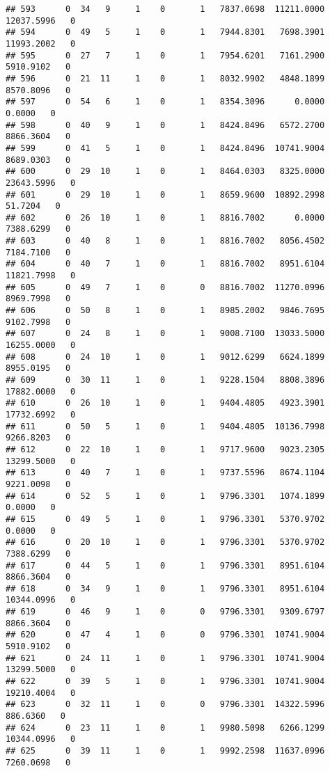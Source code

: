 \documentclass[
]{article}
\begin{document}
\begin{enumerate}
\begin{verbatim}
## 593      0  34   9     1    0       1   7837.0698  11211.0000  12037.5996   0
## 594      0  49   5     1    0       1   7944.8301   7698.3901  11993.2002   0
## 595      0  27   7     1    0       1   7954.6201   7161.2900   5910.9102   0
## 596      0  21  11     1    0       1   8032.9902   4848.1899   8570.8096   0
## 597      0  54   6     1    0       1   8354.3096      0.0000      0.0000   0
## 598      0  40   9     1    0       1   8424.8496   6572.2700   8866.3604   0
## 599      0  41   5     1    0       1   8424.8496  10741.9004   8689.0303   0
## 600      0  29  10     1    0       1   8464.0303   8325.0000  23643.5996   0
## 601      0  29  10     1    0       1   8659.9600  10892.2998     51.7204   0
## 602      0  26  10     1    0       1   8816.7002      0.0000   7388.6299   0
## 603      0  40   8     1    0       1   8816.7002   8056.4502   7184.7100   0
## 604      0  40   7     1    0       1   8816.7002   8951.6104  11821.7998   0
## 605      0  49   7     1    0       0   8816.7002  11270.0996   8969.7998   0
## 606      0  50   8     1    0       1   8985.2002   9846.7695   9102.7998   0
## 607      0  24   8     1    0       1   9008.7100  13033.5000  16255.0000   0
## 608      0  24  10     1    0       1   9012.6299   6624.1899   8955.0195   0
## 609      0  30  11     1    0       1   9228.1504   8808.3896  17882.0000   0
## 610      0  26  10     1    0       1   9404.4805   4923.3901  17732.6992   0
## 611      0  50   5     1    0       1   9404.4805  10136.7998   9266.8203   0
## 612      0  22  10     1    0       1   9717.9600   9023.2305  13299.5000   0
## 613      0  40   7     1    0       1   9737.5596   8674.1104   9221.0098   0
## 614      0  52   5     1    0       1   9796.3301   1074.1899      0.0000   0
## 615      0  49   5     1    0       1   9796.3301   5370.9702      0.0000   0
## 616      0  20  10     1    0       1   9796.3301   5370.9702   7388.6299   0
## 617      0  44   5     1    0       1   9796.3301   8951.6104   8866.3604   0
## 618      0  34   9     1    0       1   9796.3301   8951.6104  10344.0996   0
## 619      0  46   9     1    0       0   9796.3301   9309.6797   8866.3604   0
## 620      0  47   4     1    0       0   9796.3301  10741.9004   5910.9102   0
## 621      0  24  11     1    0       1   9796.3301  10741.9004  13299.5000   0
## 622      0  39   5     1    0       1   9796.3301  10741.9004  19210.4004   0
## 623      0  32  11     1    0       0   9796.3301  14322.5996    886.6360   0
## 624      0  23  11     1    0       1   9980.5098   6266.1299  10344.0996   0
## 625      0  39  11     1    0       1   9992.2598  11637.0996   7260.0698   0

\end{verbatim}
\end{enumerate}
\end{document}
